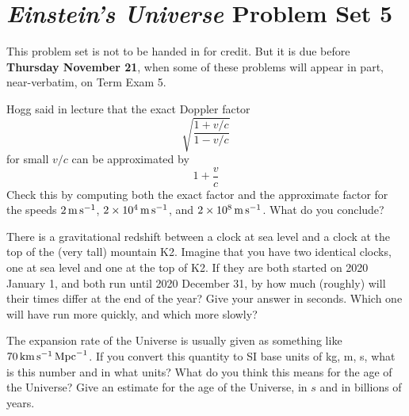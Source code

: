 \documentclass[12pt, letterpaper]{article}
\begin{document}
\section*{\textsl{Einstein's Universe} Problem Set 5}

This problem set is not to be handed in for credit. But it is due
before \textbf{Thursday November 21}, when some of these problems
will appear in part, near-verbatim, on Term Exam 5.

\begin{problem}
Hogg said in lecture that the exact Doppler factor
\begin{equation}
\sqrt{\frac{1 + {v/c}}{1 - {v/c}}}
\end{equation}
for small $v/c$ can be approximated by
\begin{equation}
1 + \frac{v}{c}
\end{equation}
Check this by computing both the exact factor and the approximate factor for
the speeds $2\,\mathrm{m}\,\mathrm{s}^{-1}$, $2\times10^4\,\mathrm{m}\,\mathrm{s}^{-1}$, and $2\times 10^8\,\mathrm{m}\,\mathrm{s}^{-1}$.
What do you conclude?
\end{problem}

\begin{problem}
There is a gravitational redshift between a clock at sea level and a clock at the
top of the (very tall) mountain K2.
Imagine that you have two identical clocks, one at sea level and one at the top of K2.
If they are both started on 2020 January 1,
and both run until 2020 December 31, by how much (roughly) will their times differ
at the end of the year? Give your answer in seconds.
Which one will have run more quickly, and which more slowly?
\end{problem}

\begin{problem}
The expansion rate of the Universe is usually given as something like $70\,\mathrm{km}\,\mathrm{s}^{-1}\,\mathrm{Mpc}^{-1}$.
If you convert this quantity to SI base units of kg, m, s, what is this number and in what units?
What do you think this means for the age of the Universe?
Give an estimate for the age of the Universe, in $s$ and in billions of years.
\end{problem}

\end{document}
